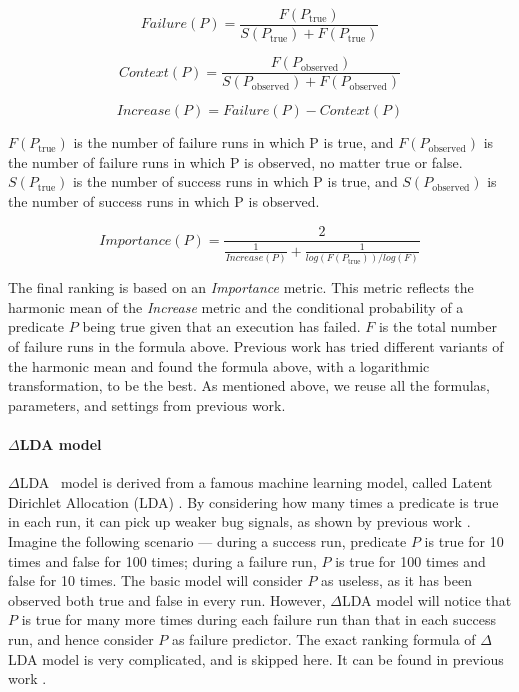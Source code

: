 \[
Failure(P) =  \frac{F(P_{\text{true}})}{S(P_{\text{true}})+F(P_{\text{true}})}
\]

\[
Context(P) =  \frac{F(P_{\text{observed}})}{S(P_{\text{observed}})+F(P_{\text{observed}})}
\]

\[
Increase(P) =  Failure(P) - Context(P)
\]

$F(P_{\text{true}})$ is the number of failure runs in which P is true, 
and $F(P_{\text{observed}})$
is the number of failure runs in which P is observed, no matter true or false. 
$S(P_{\text{true}})$ is the number of success runs 
in which P is true, and $S(P_{\text{observed}})$
is the number of success runs in which P is observed. 

 
\[
Importance(P) =  \frac{2}{\frac{1}{Increase(P)} + \frac{1}{log(F(P_{\text{true}}))/log(F)}}
\]

The final ranking is based on an \textit{Importance} metric. This metric
reflects the harmonic mean of
the \textit{Increase} metric and the conditional probability of a predicate $P$
being true given that an execution has failed. 
$F$ is the total number of failure runs in the formula above.
Previous work 
\citep{liblit05}
has tried different
variants of the harmonic mean and found the formula above, with a logarithmic
transformation, to be the best. As mentioned above, we reuse all the formulas, 
parameters, and settings from previous work. 

\paragraph{$\Delta$LDA model}
$\Delta$LDA~\citep{Delta-LDA} model is derived from a famous machine learning
model, called Latent Dirichlet Allocation 
(LDA) \citep{LDA}.
By considering how many times a predicate is true 
in each run, it can pick up weaker bug signals, as shown by previous work \citep{Delta-LDA}.
Imagine the following scenario ---
during a success run, predicate $P$ is true for
10 times and false for 100 times; during a failure run, $P$ is true for 
100 times and false for 10 times. The basic model will consider $P$ as useless,
as it has been observed both true and false in every run. However, $\Delta$LDA model will 
notice that $P$ is true for many more times during each failure run than that in 
each success
run, and hence consider $P$ as failure predictor. The exact ranking formula of
$\Delta$LDA model is very complicated, and is skipped here. It can be found
in previous work \citep{Delta-LDA}.
  
